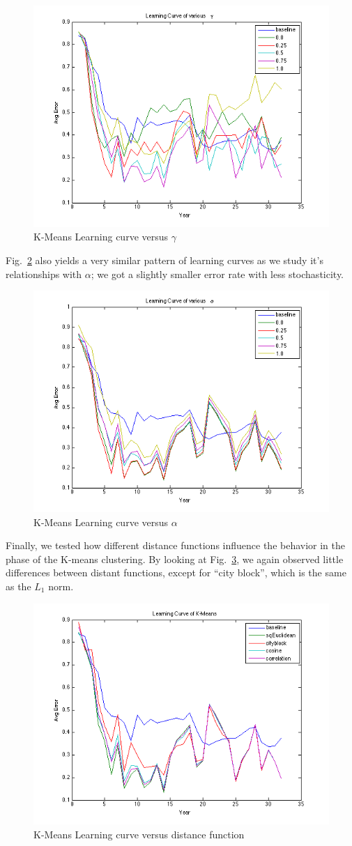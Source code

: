 \documentclass[conference]{IEEEtran}
\begin{document}
\begin{figure}[h]
	\center
	\includegraphics[width=.50\textwidth]{fig/kmeans_gamma.png}
	\caption{K-Means Learning curve versus $\gamma$}
	\label{kmeans_gamma}
\end{figure}

Fig.~\ref{kmeans_alpha} also yields a very similar pattern of learning curves as we study it's relationships with $\alpha$; we got a slightly smaller error rate with less stochasticity.
%

\begin{figure}[h]
	\center
	\includegraphics[width=.50\textwidth]{fig/kmeans_alpha.png}
	\caption{K-Means Learning curve versus $\alpha$}
	\label{kmeans_alpha}
\end{figure}

Finally, we tested how different distance functions influence the behavior in the phase of the K-means clustering. By looking at Fig.~\ref{kmeans_dist}, we again observed little differences between distant functions, except for ``city block'', which is the same as the $L_1$ norm.
\begin{figure}[h]
	\center
	\includegraphics[width=.50\textwidth]{fig/kmeans_dist.png}
	\caption{K-Means Learning curve versus distance function}
	\label{kmeans_dist}
\end{figure}
\end{document}

